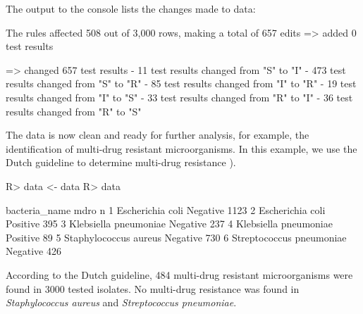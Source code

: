 \documentclass[article, shortnames]{jss}
\begin{document}
%
The output to the console lists the changes made to data:
%
\begin{CodeChunk}
\begin{CodeOutput}
The rules affected 508 out of 3,000 rows, making a total of 657 edits
=> added 0 test results

=> changed 657 test results
   - 11 test results changed from "S" to "I"
   - 473 test results changed from "S" to "R"
   - 85 test results changed from "I" to "R"
   - 19 test results changed from "I" to "S"
   - 33 test results changed from "R" to "I"
   - 36 test results changed from "R" to "S"
\end{CodeOutput}
\end{CodeChunk}
%
The data is now clean and ready for further analysis, for example, the
identification of multi-drug resistant microorganisms.  In this example, we
use the Dutch guideline to determine multi-drug resistance
\citep{Werkgroep_Infectiepreventie_WIP_undated-vu}).
%
\begin{CodeChunk}
\begin{CodeInput}
R> data <- data %
R> data %
\end{CodeInput}
\begin{CodeOutput}
             bacteria_name     mdro    n
1         Escherichia coli Negative 1123
2         Escherichia coli Positive  395
3    Klebsiella pneumoniae Negative  237
4    Klebsiella pneumoniae Positive   89
5    Staphylococcus aureus Negative  730
6 Streptococcus pneumoniae Negative  426
\end{CodeOutput}
\end{CodeChunk}
%
According to the Dutch guideline, 484 multi-drug resistant microorganisms
were found in 3000 tested isolates.  No multi-drug resistance was found in
\emph{Staphylococcus aureus} and \emph{Streptococcus pneumoniae}.
\end{document}
